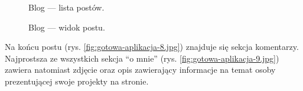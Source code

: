 \documentclass[a4paper, 12pt]{article}
\numberwithin{figure}{section}
\begin{document}
\begin{sloppypar}
\begin{figure}[H] 
    \centering
   \caption{Blog --- lista postów.}
   \label{fig:gotowa-aplikacja-6.jpg} 
\end{figure}

\begin{figure}[H] 
    \centering
   \caption{Blog --- widok postu.}
   \label{fig:gotowa-aplikacja-7.jpg}
\end{figure}

Na końcu postu (rys. \ref{fig:gotowa-aplikacja-8.jpg}) znajduje się sekcja komentarzy. Najprostsza ze wszystkich sekcja ``o mnie'' (rys. \ref{fig:gotowa-aplikacja-9.jpg}) zawiera natomiast zdjęcie oraz opis zawierający informacje na temat osoby prezentującej swoje projekty na stronie. 


\end{sloppypar}
\end{document}
